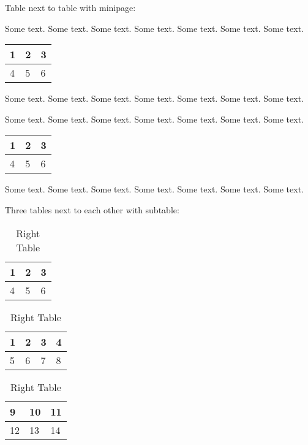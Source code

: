			\bigbreak \noindent
			Table next to table with minipage: \bigbreak \noindent
			\begin{minipage}[t]{0.5\textwidth}
				\raggedright
				Some text. Some text. Some text. Some text. Some text. Some text. Some text. \\
				\centering
				\begin{tabular}{|l|l|l|}
					\hline
					1 & 2 & 3 \\
					\hline
					4 & 5 & 6 \\
					\hline
				\end{tabular}
				\raggedright
				Some text. Some text. Some text. Some text. Some text. Some text. Some text.
			\end{minipage}%
			\begin{minipage}[t]{0.5\textwidth}
				\raggedright
				Some text. Some text. Some text. Some text. Some text. Some text. Some text. \\
				\centering
				\begin{tabular}{|l|l|l|}
					\hline
					1 & 2 & 3 \\
					\hline
					4 & 5 & 6 \\
					\hline
				\end{tabular}
				\raggedright
				Some text. Some text. Some text. Some text. Some text. Some text. Some text.
			\end{minipage}
			
			\bigbreak \noindent
			Three tables next to each other with subtable:
			\begin{table}[H]
				\centering
				\begin{subtable}{0.3\textwidth}
					\centering
					\begin{tabular}{|l|l|l|}
						\hline
						1 & 2 & 3 \\
						\hline
						4 & 5 & 6 \\
						\hline
					\end{tabular}
					\caption{Left Table}
				\end{subtable}
				\hfill
				\begin{subtable}{0.3\textwidth}
					\centering
					\begin{tabular}{|l|l|l|l|}
						\hline
						1 & 2 & 3 & 4 \\
						\hline
						5 & 6 & 7 & 8 \\
						\hline
					\end{tabular}
					\caption{Center Table}
				\end{subtable}
				\hfill
				\begin{subtable}{0.3\textwidth}
					\centering
					\begin{tabular}{|l|l|l|}
						\hline
						9 & 10 & 11 \\
						\hline
						12 & 13 & 14 \\
						\hline
					\end{tabular}
					\caption{Right Table}
				\end{subtable}
			\end{table}
			
